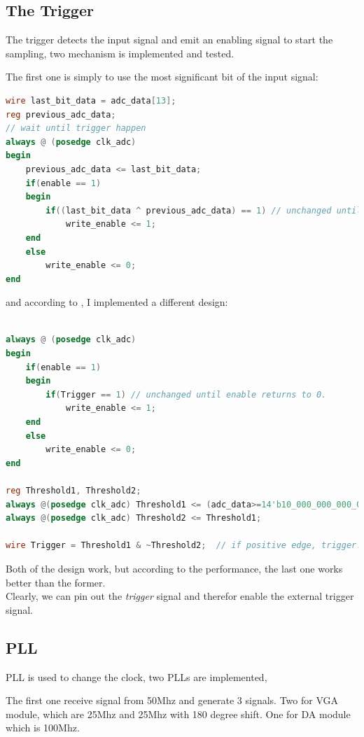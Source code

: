 \documentclass[11pt]{scrartcl}
\begin{document}
\subsection{The Trigger}
\label{sec:trigger}
The trigger detects the input signal and emit an enabling signal to start the sampling, two mechanism is implemented and tested.


The first one is simply to use the most significant bit of the input signal:

\begin{lstlisting}[language=Verilog]
wire last_bit_data = adc_data[13];
reg previous_adc_data;
// wait until trigger happen
always @ (posedge clk_adc)
begin
	previous_adc_data <= last_bit_data;
	if(enable == 1)
	begin
		if((last_bit_data ^ previous_adc_data) == 1) // unchanged until enable returns to 0.
			write_enable <= 1;
	end
	else
		write_enable <= 0;
end
\end{lstlisting}

and according to \cite{trigger}, I implemented a different design:

\begin{lstlisting}[language=Verilog]

always @ (posedge clk_adc)
begin
	if(enable == 1)
	begin
		if(Trigger == 1) // unchanged until enable returns to 0.
			write_enable <= 1;
	end
	else
		write_enable <= 0;
end

reg Threshold1, Threshold2;
always @(posedge clk_adc) Threshold1 <= (adc_data>=14'b10_000_000_000_000);
always @(posedge clk_adc) Threshold2 <= Threshold1;

wire Trigger = Threshold1 & ~Threshold2;  // if positive edge, trigger! 
\end{lstlisting}

Both of the design work, but according to the performance, the last one works better than the former.\\

Clearly, we can pin out the \textit{trigger} signal and therefor enable the external trigger signal.
\subsection{PLL}

PLL is used to change the clock, two PLLs are implemented,

The first one receive signal from 50Mhz and generate 3 signals. Two for VGA module, which are 25Mhz and 25Mhz with 180 degree shift. One for DA module which is 100Mhz.
\end{document}
